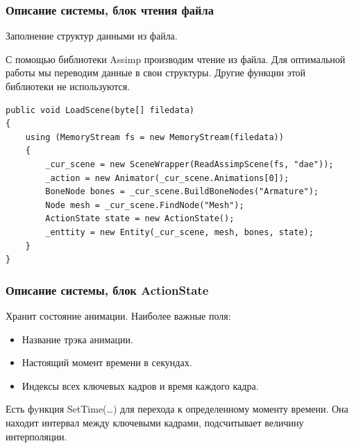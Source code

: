 \documentclass{beamer}
\begin{document}
\begin{frame}[fragile]
\frametitle{Описание системы, блок чтения файла}
	Заполнение структур данными из файла.
	    
    \smallskip
	С помощью библиотеки Assimp производим чтение из файла. Для оптимальной работы мы переводим данные в свои структуры. Другие функции этой библиотеки не используются.
	
\begin{scriptsize}
\begin{lstlisting}
public void LoadScene(byte[] filedata)
{
    using (MemoryStream fs = new MemoryStream(filedata))
    {
        _cur_scene = new SceneWrapper(ReadAssimpScene(fs, "dae"));
        _action = new Animator(_cur_scene.Animations[0]);
        BoneNode bones = _cur_scene.BuildBoneNodes("Armature");
        Node mesh = _cur_scene.FindNode("Mesh");
        ActionState state = new ActionState();
        _enttity = new Entity(_cur_scene, mesh, bones, state);
    }
}
\end{lstlisting}
\end{scriptsize}
		
\end{frame}



\begin{frame}
\frametitle{Описание системы, блок ActionState}	
	Хранит состояние анимации. Наиболее важные поля:
\begin{itemize}        
    \item Название трэка анимации.
	\item Настоящий момент времени в секундах.
	\item Индексы всех ключевых кадров и время каждого кадра.
\end{itemize}

    Есть фyнкция SetTime(\dots) для перехода к определенному моменту времени. Она находит интервал между ключевыми кадрами, подсчитывает величину интерполяции.
\end{frame}
\end{document}
